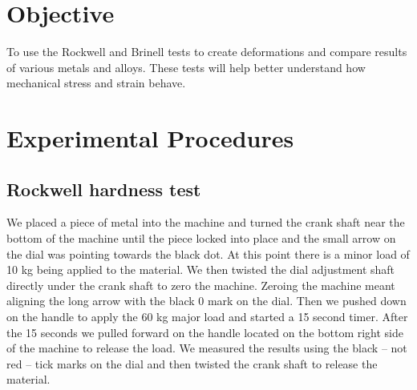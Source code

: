 \documentclass{article}
\begin{document}



\section{Objective}

To use the Rockwell and Brinell tests to create deformations and compare results of various metals and alloys. These tests will help better understand how mechanical stress and strain behave.


\section{Experimental Procedures}
\subsection{Rockwell hardness test}
We placed a piece of metal into the machine and turned the crank shaft near the bottom of the machine until the piece locked into place and the small arrow on the dial was pointing towards the black dot. At this point there is a minor load of 10 kg being applied to the material. We then twisted the dial adjustment shaft directly under the crank shaft to zero the machine. Zeroing the machine meant aligning the long arrow with the black 0 mark on the dial. Then we pushed down on the handle to apply the 60 kg major load and started a 15 second timer. After the 15 seconds we pulled forward on the handle located on the bottom right side of the machine to release the load. We measured the results using the black – not red – tick marks on the dial and then twisted the crank shaft to release the material.
\end{document}
